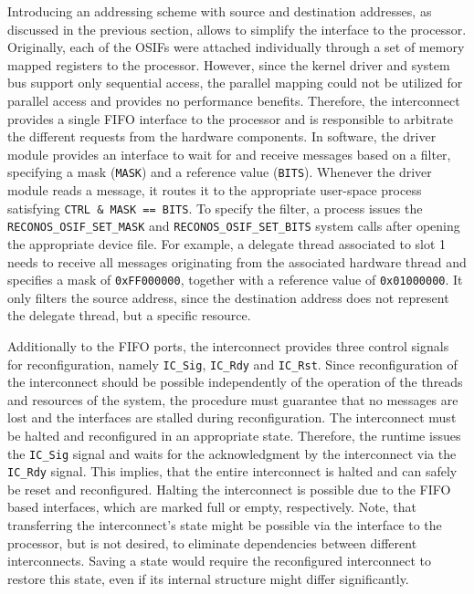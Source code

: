 Introducing an addressing scheme with source and destination addresses, as
discussed in the previous section, allows to simplify the interface to the
processor. Originally, each of the \acp{OSIF} were attached individually
through a set of memory mapped registers to the processor. However, since the
kernel driver and system bus support only sequential access, the parallel
mapping could not be utilized for parallel access and provides no performance
benefits. Therefore, the interconnect provides a single \ac{FIFO} interface to
the processor and is responsible to arbitrate the different requests from the
hardware components. In software, the driver module provides an interface to
wait for and receive messages based on a filter, specifying a mask
(\lstinline{MASK}) and a reference value (\lstinline{BITS}). Whenever the
driver module reads a message, it routes it to the appropriate user-space
process satisfying \lstinline{CTRL & MASK == BITS}. To specify the filter, a
process issues the \lstinline{RECONOS_OSIF_SET_MASK} and
\lstinline{RECONOS_OSIF_SET_BITS} system calls after opening the appropriate
device file. For example, a delegate thread associated to slot 1 needs to
receive all messages originating from the associated hardware thread and
specifies a mask of \lstinline{0xFF000000}, together with a reference value of
\lstinline{0x01000000}. It only filters the source address, since the
destination address does not represent the delegate thread, but a specific
resource.

Additionally to the \ac{FIFO} ports, the interconnect provides three control
signals for reconfiguration, namely \lstinline{IC_Sig}, \lstinline{IC_Rdy} and
\lstinline{IC_Rst}. Since reconfiguration of the interconnect should be
possible independently of the operation of the threads and resources of the
system, the procedure must guarantee that no messages are lost and the
interfaces are stalled during reconfiguration. The interconnect must be halted
and reconfigured in an appropriate state. Therefore, the runtime issues the
\lstinline{IC_Sig} signal and waits for the acknowledgment by the interconnect
via the \lstinline{IC_Rdy} signal. This implies, that the entire
interconnect is halted and can safely be reset and reconfigured. Halting the
interconnect is possible due to the \ac{FIFO} based interfaces, which are
marked full or empty, respectively. Note, that transferring the interconnect's
state might be possible via the interface to the processor, but is not
desired, to eliminate dependencies between different interconnects. Saving a
state would require the reconfigured interconnect to restore this state, even
if its internal structure might differ significantly.

